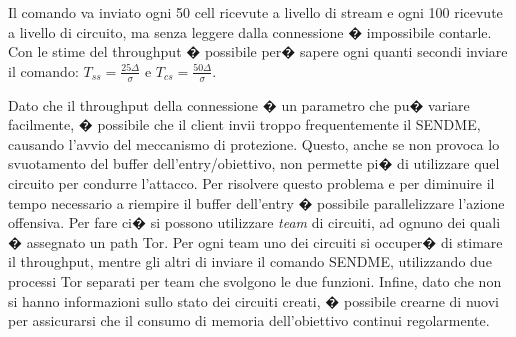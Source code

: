 Il comando va inviato ogni 50 cell ricevute a livello di stream e ogni 100 ricevute a livello di circuito, ma senza leggere dalla connessione � impossibile contarle. Con le stime del throughput � possibile per� sapere ogni quanti secondi inviare il comando: $T_{ss}=\frac{25 \Delta}{\sigma}$ e $T_{cs}=\frac{50 \Delta}{\sigma}$.

Dato che il throughput della connessione � un parametro che pu� variare facilmente, � possibile che il client invii troppo frequentemente il {\ttfamily SENDME}, causando l'avvio del meccanismo di protezione. Questo, anche se non provoca lo svuotamento del buffer dell'entry/obiettivo, non permette pi� di utilizzare quel circuito per condurre l'attacco. Per risolvere questo problema e per diminuire il tempo necessario a riempire il buffer dell'entry � possibile parallelizzare l'azione offensiva. Per fare ci� si possono utilizzare \emph{team} di circuiti, ad ognuno dei quali � assegnato un path Tor. Per ogni team uno dei circuiti si occuper� di stimare il throughput, mentre gli altri di inviare il comando {\ttfamily SENDME}, utilizzando due processi Tor separati per team che svolgono le due funzioni. Infine, dato che non si hanno informazioni sullo stato dei circuiti creati, � possibile crearne di nuovi per assicurarsi che il consumo di memoria dell'obiettivo continui regolarmente.

